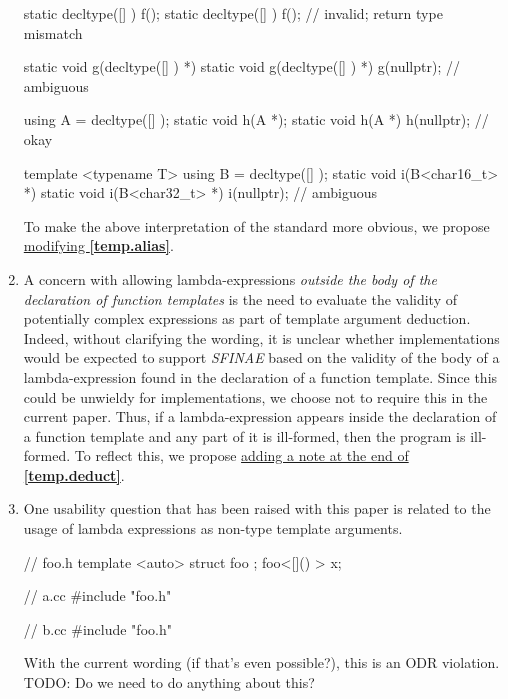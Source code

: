\documentclass{wg21}
\begin{document}
\begin{enumerate}
\begin{cpp}
static decltype([] { }) f();
static decltype([] { }) f(); // invalid; return type mismatch

static void g(decltype([] { }) *) { }
static void g(decltype([] { }) *) { }
g(nullptr); // ambiguous

using A = decltype([] { });
static void h(A *);
static void h(A *) { }
h(nullptr); // okay

template <typename T>
using B = decltype([] { });
static void i(B<char16_t> *) { }
static void i(B<char32_t> *) { }
i(nullptr); // ambiguous
\end{cpp}

    To make the above interpretation of the standard more obvious, we propose
    \hyperref[wording.redeclarations]{modifying \textbf{[temp.alias]}}.


  \item \label{discussion.sfinae}
    A concern with allowing lambda-expressions \textit{outside the body of
    the declaration of function templates} is the need to evaluate the validity
    of potentially complex expressions as part of template argument deduction.
    Indeed, without clarifying the wording, it is unclear whether implementations
    would be expected to support \textit{SFINAE} based on the validity of
    the body of a lambda-expression found in the declaration of a function
    template. Since this could be unwieldy for implementations, we choose not
    to require this in the current paper. Thus, if a lambda-expression appears
    inside the declaration of a function template and any part of it is ill-formed,
    then the program is ill-formed. To reflect this, we propose
    \hyperref[wording.sfinae]{adding a note at the end of \textbf{[temp.deduct]}}.

  \item \label{discussion.nontype}
    One usability question that has been raised with this paper is related
    to the usage of lambda expressions as non-type template arguments.

\begin{cpp}
// foo.h
template <auto> struct foo { };
foo<[]() {}> x;

// a.cc
#include "foo.h"

// b.cc
#include "foo.h"
\end{cpp}

    With the current wording (if that's even possible?), this is an ODR violation.
    TODO: Do we need to do anything about this?

\end{enumerate}
\end{document}
